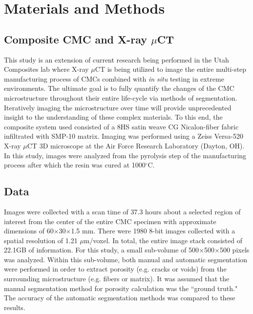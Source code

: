 \documentclass[11pt, twocolumn]{IEEEtran}
\begin{document}
\section{Materials and Methods}

\subsection{Composite CMC and X-ray $\mu$CT}
This study is an extension of current research being performed in the Utah Composites lab where X-ray $\mu$CT is being utilized to image the entire multi-step manufacturing process of CMCs combined with \textit{in situ} testing in extreme environments. The ultimate goal is to fully quantify the changes of the CMC microstructure throughout their entire life-cycle via methods of segmentation. Iteratively imaging the microstructure over time will provide unprecedented insight to the understanding of these complex materials. To this end, the composite system used consisted of a 8HS satin weave CG Nicalon-fiber fabric infiltrated with SMP-10 matrix. Imaging was performed using a Zeiss Versa-520 X-ray $\mu$CT 3D microscope at the Air Force Research Laboratory (Dayton, OH). In this study, images were analyzed from the pyrolysis step of the manufacturing process after which the resin was cured at 1000$^{\circ}$C.

\subsection{Data}
Images were collected with a scan time of 37.3 hours about a selected region of interest from the center of the entire CMC specimen with approximate dimensions of 60$\times$30$\times$1.5 mm. There were 1980 8-bit images collected with a spatial resolution of 1.21 $\mu$m/voxel. In total, the entire image stack consisted of 22.1GB of information. For this study, a small sub-volume of 500$\times$500$\times$500 pixels was analyzed. Within this sub-volume, both manual and automatic segmentation were performed in order to extract porosity (e.g. cracks or voids) from the surrounding microstructure (e.g. fibers or matrix). It was assumed that the manual segmentation method for porosity calculation was the ``ground truth." The accuracy of the automatic segmentation methods was compared to these results.
\end{document}
